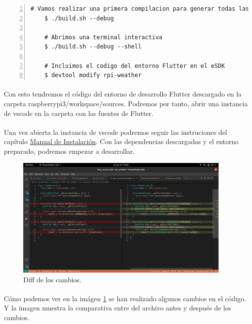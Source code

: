 \begin{lstlisting}[style=consola, numbers=left]
    # Vamos realizar una primera compilacion para generar todas las tools del SDK
    $ ./build.sh --debug

    # Abrimos una terminal interactiva
    $ ./build.sh --debug --shell

    # Incluimos el codigo del entorno Flutter en el eSDK
    $ devtool modify rpi-weather
\end{lstlisting}

\paragraph{}Con esto tendremos el código del entorno de desarrollo Flutter descargado
en la carpeta raspberrypi3/workspace/sources. Podremos por tanto, abrir una instancia
de \Gls{vscode} en la carpeta con las fuentes de Flutter.

\paragraph{}Una vez abierta la instancia de \Gls{vscode} podremos seguir las instruciones
del capítulo \href{sec:ManualDeInstalacion}{Manual de Instalación}. Con las dependencias
descargadas y el entorno preparado, podremos empezar a desarrollar.

\begin{figure}[H]
    \centering
    \includegraphics[width=0.95\textwidth]{imgs/dev1}
    \caption[Diff de los cambios.]{Diff de los cambios.}
    \label{imgs:diff-code}
\end{figure}

\paragraph{}Cómo podemos ver en la imágen \ref{imgs:diff-code} se han realizado algunos
cambios en el código. Y la imagen muestra la comparativa entre del archivo antes y después
de los cambios.

